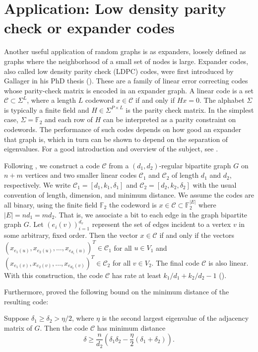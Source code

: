 \section{Application: Low density parity check or expander codes}
\label{sec:codes}

Another useful application of random graphs is as expanders,
loosely defined as graphs where the neighborhood of a small set of nodes is large.
Expander codes, also called low density parity check (LDPC) codes,
were first introduced by Gallager in his PhD thesis
(\citet*{gallager1962}).
These are a family of linear error correcting codes whose parity-check matrix 
is encoded in an expander graph.
A linear code is a set $\mathcal{C} \subset \Sigma^L$,
where a length $L$ codeword
$x \in \mathcal{C}$ if and only if
$H x = 0$.
The alphabet $\Sigma$ is typically a finite field
and $H \in \Sigma^{P \times L}$ is the parity check matrix.
In the simplest case, $\Sigma = \mathbb{F}_2$ and each row of $H$ 
can be interpreted as a parity constraint on codewords.
The performance of such codes depends on how good an expander that graph is,
which in turn can be shown to depend on the separation of eigenvalues.
For a good introduction and overview of the subject, 
see \citet*{richardson2008}.

Following \citet*{tanner1981}, 
we construct a code $\mathcal{C}$ 
from a $(d_1,d_2)$-regular bipartite graph $G$
on $n + m$ vertices
and two smaller linear codes 
$\mathcal{C}_1$ and $\mathcal{C}_2$ of length
$d_1$ and $d_2$, respectively.
We write 
$\mathcal{C}_1 = [d_1, k_1, \delta_1]$ 
and
$\mathcal{C}_2 = [d_2, k_2, \delta_2]$
with the usual convention
of length, dimension, and minimum distance.
We assume the codes are all binary, using the finite field $\mathbb{F}_2$ 
the codeword is $x \in \mathcal{C} \subset \mathbb{F}_2^{|E|}$
where  $|E| = n d_1 = m d_2$.
That is, we associate a bit to each edge in the graph bipartite graph $G$.
Let $( e_i(v) )_{i=1}^{d_v}$ 
represent the set of edges incident to a vertex $v$
in some arbitrary, fixed order.
Then the vector $x \in \mathcal{C}$ if and only if the vectors
$( x_{e_1(u)}, x_{e_2(u)}, \ldots, x_{e_{d_1}(u)} )^T \in \mathcal{C}_1$
for all $u \in V_1$ and
$( x_{e_1(v)}, x_{e_2(v)}, \ldots, x_{e_{d_2}(v)} )^T \in \mathcal{C}_2$
for all $v \in V_2$.
The final code $\mathcal{C}$ is also linear.
With this construction, the code $\mathcal{C}$ 
has rate at least $k_1 / d_1 + k_2/d_2 - 1$ (\citet*{tanner1981}).

Furthermore, \citet*{janwa2003} proved the following bound on
the minimum distance of the resulting code:
\begin{theorem}
\label{thm:JanwaLal}
Suppose $\delta_1 \geq \delta_2 > \eta/2$, where $\eta$ is the second largest eigenvalue of the adjacency matrix of $G$. Then the code $\mathcal{C}$ has minimum distance
\[
\delta \geq \frac{n}{d_2} \left( \delta_1 \delta_2 - \frac{\eta}{2} (\delta_1 + \delta_2 ) \right).
\]

\end{theorem}

